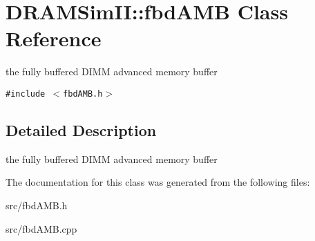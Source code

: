 \section{DRAMSimII::fbdAMB Class Reference}
\label{class_d_r_a_m_sim_i_i_1_1fbd_a_m_b}
the fully buffered DIMM advanced memory buffer  


{\tt \#include $<$fbdAMB.h$>$}



\subsection{Detailed Description}
the fully buffered DIMM advanced memory buffer 

The documentation for this class was generated from the following files:\begin{CompactItemize}
\item 
src/fbdAMB.h\item 
src/fbdAMB.cpp\end{CompactItemize}
